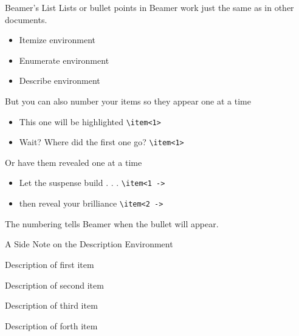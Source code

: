 \documentclass[mathserif, xcolor=svgnames]{beamer}
\begin{document}
\begin{frame}[fragile]{Beamer's List}
Lists or bullet points in Beamer work just the same as in other documents.

\begin{itemize}
\item Itemize environment
\item Enumerate environment
\item Describe environment
\end{itemize}

But you can also number your items so they appear one at a time
\begin{itemize}
\item<2> This one will be highlighted \verb+\item<1>+
\item<3> Wait?  Where did the first one go? \verb+\item<1>+
\end{itemize}

Or have them revealed one at a time
\begin{itemize}
\item<4-> Let the suspense build . . . \verb+\item<1 ->+
\item<5 -> then reveal your brilliance \verb+\item<2 ->+
\end{itemize}

The numbering tells Beamer when the bullet will appear.

\end{frame}

\begin{frame}{A Side Note on the Description Environment}
\begin{description}
\item[First Item] Description of first item
\item[Second Item] Description of second item
\item[Third Item] Description of third item
\item[Forth Item] Description of forth item
\end{description}
\end{frame}
\end{document}
